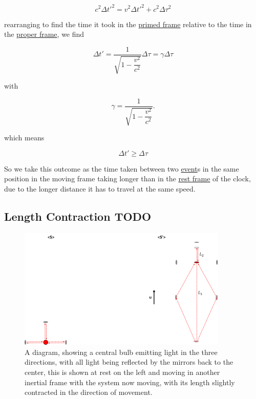 \begin{equation}
	c^2 \Delta t'^2 = v^2 \Delta t'^2 + c^2\Delta \tau^2
\end{equation}

rearranging to find the time it took in the \hyperlink{def-Primed-Frame}{primed frame} relative to the time in the \hyperlink{def-proper-frame}{proper frame}, we find

\begin{equation}
	\Delta t' = \dfrac{1}{\sqrt{1-\dfrac{v^2}{c^2}}} \Delta \tau = {\gamma} \Delta \tau
\end{equation}

with

\begin{equation}
	{\gamma} = \dfrac{1}{\sqrt{1-\dfrac{v^2}{c^2}}}.
\end{equation}

which means

\begin{equation}
	\Delta t' \geq \Delta \tau
\end{equation}

So we take this outcome as the time taken between two \hyperlink{def-event}{event}s in the same position in the moving frame taking longer than in the \hyperlink{def-proper-frame}{rest frame} of the clock, due to the longer distance it has to travel at the same speed.

\subsection{Length Contraction TODO}

\begin{figure}[H]
	\centering
	\includegraphics[width=10cm]{images/pdf/Length_Contraction.pdf}
	\caption{A diagram, showing a central bulb emitting light in the three directions, with all light being reflected by the mirrors back to the center, this is shown at rest on the left and moving in another inertial frame with the system now moving, with its length slightly contracted in the direction of movement.}
	\label{fig: length contraction math}
\end{figure}

